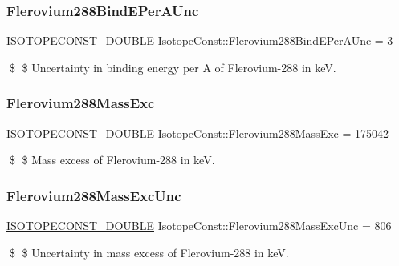 \subsubsection{\texorpdfstring{Flerovium288\+Bind\+E\+Per\+A\+Unc}{Flerovium288BindEPerAUnc}}
{\footnotesize\ttfamily \mbox{\hyperlink{group___isotope_const-_macros_ga8f45a7272ce02c0b4c65c44636ed719a}{I\+S\+O\+T\+O\+P\+E\+C\+O\+N\+S\+T\+\_\+\+D\+O\+U\+B\+LE}} Isotope\+Const\+::\+Flerovium288\+Bind\+E\+Per\+A\+Unc = 3}

\$ \$ Uncertainty in binding energy per A of Flerovium-\/288 in keV. \mbox{\label{group___isotope_const-_flerovium-_fl288_ga52dcb17dad0d9e0fddcfcec3e5289304}} 
\subsubsection{\texorpdfstring{Flerovium288\+Mass\+Exc}{Flerovium288MassExc}}
{\footnotesize\ttfamily \mbox{\hyperlink{group___isotope_const-_macros_ga8f45a7272ce02c0b4c65c44636ed719a}{I\+S\+O\+T\+O\+P\+E\+C\+O\+N\+S\+T\+\_\+\+D\+O\+U\+B\+LE}} Isotope\+Const\+::\+Flerovium288\+Mass\+Exc = 175042}

\$ \$ Mass excess of Flerovium-\/288 in keV. \mbox{\label{group___isotope_const-_flerovium-_fl288_gae0b4b315ac470ed46a1cf11a08ca2be7}} 
\subsubsection{\texorpdfstring{Flerovium288\+Mass\+Exc\+Unc}{Flerovium288MassExcUnc}}
{\footnotesize\ttfamily \mbox{\hyperlink{group___isotope_const-_macros_ga8f45a7272ce02c0b4c65c44636ed719a}{I\+S\+O\+T\+O\+P\+E\+C\+O\+N\+S\+T\+\_\+\+D\+O\+U\+B\+LE}} Isotope\+Const\+::\+Flerovium288\+Mass\+Exc\+Unc = 806}

\$ \$ Uncertainty in mass excess of Flerovium-\/288 in keV. \mbox{\label{group___isotope_const-_flerovium-_fl288_gaae7aa45a13ef2bf0c596d221e40370a9}} 
